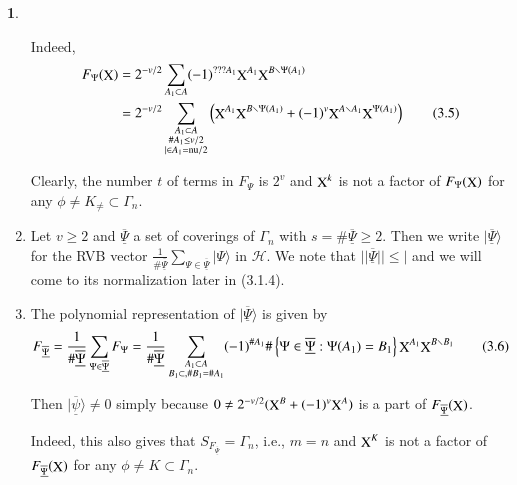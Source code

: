 \documentclass[a4paper,12pt]{article}
\DeclareMathOperator{\x}{\mathrm{X}}
\theoremstyle{definition}
\theoremstyle{underlinethm}
\theoremstyle{definition}
\newtheorem{subsubsec}{}[subsection]
\begin{document}
\begin{subsubsec}
\begin{enumerate}[label=(\alph*)]
Indeed, 
\begin{align*}
F_{\Psi}(\bold{\x}) &= 2^{-v/2} \sum_{A_{1} \subset A}(-1)^{??? A_{1}} \bold{\x}^{A_{1}} \bold{\x}^{B\smallsetminus\Psi(A_{1})}\nonumber\\
& = 2^{-v/2} \sum_{\substack{A_{1} \subset A \\ \#A_{1} \leq v/2 \\ | \in A_{1}={\rm nu}/2 }} \left(\bold{\x}^{A_{1}} \bold{\x}^{B\smallsetminus \Psi (A_{1}) } + (-1)^{v} \bold{\x}^{A \smallsetminus A_{1}} \bold{\x}^{\Psi (A_{1})} \right)\tag{3.5}  
\end{align*}

Clearly, the number $t$ of terms in $F_{\Psi}$ is $2^{v}$ and $\bold{\x}^{k}$ is not a factor of $F_{\Psi}(\bold{\x})$ for any $\phi \neq K_{\neq} \subset \Gamma_{n}$.

\item Let $v \geq 2$ and $\underline{\overline{\Psi}}$ a set of coverings of $\Gamma_{n}$ with $s= \# \underline{\overline{\Psi}} \geq 2$. Then we write $| \underline{\overline{\Psi}}\rangle$ for the RVB vector $\frac{1}{\# \underline{\overline{\Psi}}} \sum_{\Psi \in \underline{\overline{\Psi}}} | \Psi \rangle$ in $\mathcal{H}$. We note that $|| \underline{\overline{\Psi}} || \leq |$ and we will come to its normalization later in (3.1.4).

\item The polynomial representation of $| \underline{\overline{\Psi}}\rangle$ is given by
\begin{equation}
F_{\underline{\overline{\Psi}}} = \frac{1}{\# \underline{\overline{\Psi}}} \sum_{\Psi \in \underline{\overline{\Psi}}} F_{\Psi} = \frac{1}{\# \underline{\overline{\Psi}}} \sum_{\substack{{A_{1} \subset A}\\ B_{1}\subset, \# B_{1}= \# A_{1}}} (-1)^{\# A_{1}} \# \left\{ \Psi \in \underline{\overline{\Psi}} : \Psi (A_{1}) = B_{1}\right\} \bold{\x}^{A_{1}} \bold{\x}^{B\smallsetminus B_{1}}\tag{3.6}\label{eq-3.6}
\end{equation}

Then $| \underline{\overline{\psi}} \rangle \neq 0$ simply because $0 \neq 2^{-v/2}(\bold{\x}^{B} + (-1)^{v} \bold{\x}^{A})$ is a part of $F_{\underline{\overline{\Psi}}}(\bold{\x})$.

Indeed, this also gives that $S_{F_{\underline{\overline{\Psi}}}} = \Gamma_{n}$, i.e., $m=n$ and $\bold{\x}^{K}$ is not a factor of $F_{\underline{\overline{\Psi}}} (\bold{\x})$ for any $\phi \neq K \subset \Gamma_{n}$.


\end{enumerate}
\end{subsubsec}
\end{document}
